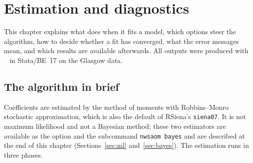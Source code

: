 \chapter{Estimation and diagnostics}\label{ch:estimation}

This chapter explains what \nwsaom{} does when it fits a model, which options steer the algorithm, how to decide whether a fit has converged, what the error messages mean, and which results are available afterwards. All outputs were produced with \nwsaom{}~\pkgversion{} in Stata/BE~17 on the Glasgow data.

\section{The algorithm in brief}\label{sec:algorithm}
Coefficients are estimated by the method of moments with Robbins--Monro stochastic approximation, which is also the default of RSiena's \texttt{siena07}. It is not maximum likelihood and not a Bayesian method; these two estimators are available as the option  and the subcommand \texttt{nwsaom bayes} and are described at the end of this chapter (Sections~\ref{sec:ml} and~\ref{sec:bayes}). The estimation runs in three phases.
